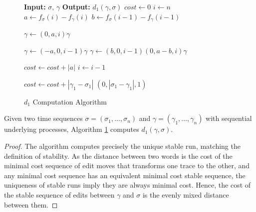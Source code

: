 \documentclass[runningheads]{llncs}
\makeatletter
\newcommand{\removelatexerror}{\let\@latex@error\@gobble}
\makeatother
\begin{document}
\begin{figure}[!t]
	\removelatexerror
	\begin{algorithm}[H]
		\caption{$d_1$ Computation Algorithm}
		\label{MixBackwardsAlgo}
		\begin{algorithmic}
			\State \textbf{Input: }  $\sigma$, $\gamma$
			\State \textbf{Output: }  $d_1(\gamma, \sigma)$
			\State $cost \gets 0$
			\State $i \gets n$
			\State $a \gets f_\sigma(i) - f_\gamma(i)$
			\State $b \gets f_\sigma(i-1) - f_\gamma(i-1)$
			
		\State $\gamma \gets (0, a, i) \gamma$
		
	
	\State $\gamma \gets (-a, 0, i-1)\gamma$
	\Else
\State $\gamma \gets (b, 0, i-1)(0, a-b, i) \gamma$
\EndIf

\State  $cost \gets cost + |a|$ 
\State $i \gets i-1$
\EndWhile

\State $cost \gets cost + |\gamma_1 - \sigma_1|$  \Comment $(0, |\sigma_1- \gamma_1|, 1)$

\end{algorithmic}
\end{algorithm}
\end{figure}

\color{firstrevision}
\begin{lemma}\label{MixAlgoCorr}Given two time sequences $\sigma = (\sigma_1, \dots, \sigma_n)$ and $\gamma = (\gamma_1, \dots, \gamma_n)$ with sequential underlying processes,
Algorithm \ref{MixBackwardsAlgo} computes $d_1(\gamma, \sigma)$.\end{lemma}


\begin{proof}
The algorithm computes precisely the unique stable run, matching the definition of stability. 
As the distance between two words is the cost of the minimal cost sequence of edit moves that transforms one trace to the other, and any minimal cost sequence has an equivalent minimal cost stable sequence, the uniqueness of stable runs imply they are always minimal cost. 
Hence, the cost of the stable sequence of edits between $\gamma$ and $\sigma$ is the evenly mixed distance between them. \end{proof}
\end{document}
